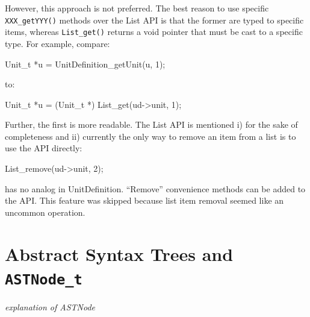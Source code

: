 \documentclass{cekmanual}
\begin{document}
However, this approach is not preferred.  The best reason to use
specific \texttt{XXX\_getYYY()} methods over the List API is that the
former are typed to specific items, whereas \texttt{List\_get()}
returns a void pointer that must be cast to a specific type.  For
example, compare:

\begin{example}[c]
Unit_t *u = UnitDefinition_getUnit(u, 1);
\end{example}

to:

\begin{example}[c]
  Unit_t *u = (Unit_t *) List_get(ud->unit, 1);
\end{example}

Further, the first is more readable.  The List API is mentioned i) for
the sake of completeness and ii) currently the only way to remove an
item from a list is to use the API directly:

\begin{example}[c]
List_remove(ud->unit, 2);
\end{example}

has no analog in UnitDefinition.  ``Remove'' convenience methods can be
added to the API.  This feature was skipped because list item removal
seemed like an uncommon operation.


\section{Abstract Syntax Trees and \texttt{ASTNode\_t}}
\label{app:ast}

\emph{explanation of ASTNode}








\clearpage



\end{document}
